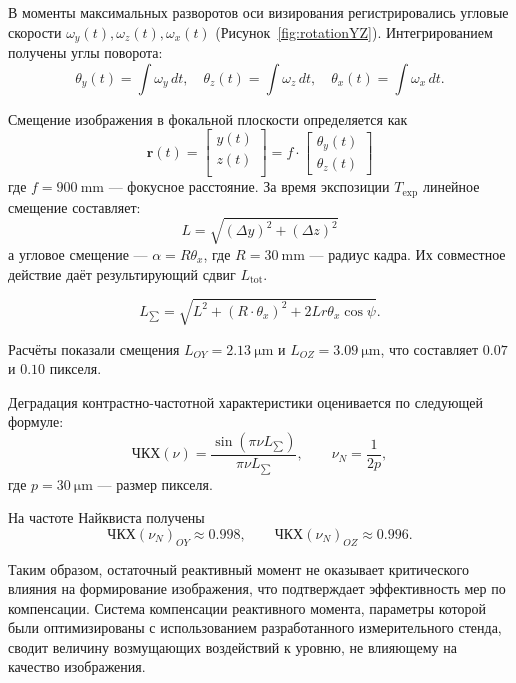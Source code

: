 В моменты максимальных разворотов оси визирования регистрировались угловые скорости
$\omega_y(t), \omega_z(t), \omega_x(t)$ (Рисунок~\cref{fig:rotationYZ}).
Интегрированием получены углы поворота:
\begin{equation*}
	\theta_y(t)=\int \omega_y\,dt,\quad
	\theta_z(t)=\int \omega_z\,dt,\quad
	\theta_x(t)=\int \omega_x\,dt.
\end{equation*}

Смещение изображения в фокальной плоскости определяется как
\begin{equation*}
	\label{eq:bias}
	\mathbf{r}(t) = 
	\begin{bmatrix}
		y(t) \\
		z(t) \\
	\end{bmatrix}
	= f \cdot
	\begin{bmatrix}
		\theta_{y}(t) \\
		\theta_{z}(t)
	\end{bmatrix}
\end{equation*}
где $f=\SI{900}{\milli\meter}$ — фокусное расстояние.
За время экспозиции $T_{\mathrm{exp}}$ линейное смещение составляет:
 \begin{equation*}
	\label{eq:biasL}
	L=\sqrt{(\Delta y)^2+(\Delta z)^2}
\end{equation*}
а угловое смещение — $\alpha=R\theta_x$, где $R=\SI{30}{\milli\meter}$ — радиус кадра.
Их совместное действие даёт результирующий сдвиг $L_{\mathrm{tot}}$.

 \begin{equation*}
	\label{eq:L_total}
	L_{\sum} = \sqrt{L^2 + (R\cdot \theta_x)^2 + 2Lr\theta_x\cos{\psi}}.
\end{equation*}

Расчёты показали смещения
$L_{OY}=\SI{2.13}{\micro\meter}$ и
$L_{OZ}=\SI{3.09}{\micro\meter}$,
что составляет $0.07$ и $0.10$ пикселя.

Деградация контрастно-частотной характеристики оценивается по следующей формуле:
\begin{equation*}
	\text{ЧКХ}(\nu)=\frac{\sin(\pi\nu L_{\mathrm{\sum}})}{\pi\nu L_{\mathrm{\sum}}},\qquad
	\nu_N=\frac{1}{2p},
\end{equation*}
где $p=\SI{30}{\micro\meter}$ — размер пикселя.

 На частоте Найквиста получены
\[
ЧКХ(\nu_N)_{OY}\approx 0.998,\qquad
ЧКХ(\nu_N)_{OZ}\approx 0.996.
\]

Таким образом, остаточный реактивный момент не оказывает критического
влияния на формирование изображения, что подтверждает эффективность
мер по компенсации. Система компенсации реактивного момента,
параметры которой были оптимизированы с использованием разработанного
измерительного стенда, сводит величину возмущающих воздействий к
уровню, не влияющему на качество изображения.


